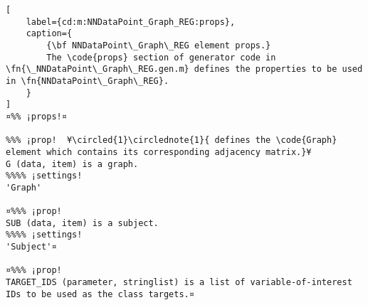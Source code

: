 \documentclass{tufte-handout}
\begin{document}
\begin{lstlisting}[
	label={cd:m:NNDataPoint_Graph_REG:props},
	caption={
		{\bf NNDataPoint\_Graph\_REG element props.}
		The \code{props} section of generator code in \fn{\_NNDataPoint\_Graph\_REG.gen.m} defines the properties to be used in \fn{NNDataPoint\_Graph\_REG}.
	}
]
¤%% ¡props!¤

%%% ¡prop!  ¥\circled{1}\circlednote{1}{ defines the \code{Graph} element which contains its corresponding adjacency matrix.}¥
G (data, item) is a graph.
%%%% ¡settings!
'Graph'

¤%%% ¡prop!
SUB (data, item) is a subject.
%%%% ¡settings!
'Subject'¤

¤%%% ¡prop!
TARGET_IDS (parameter, stringlist) is a list of variable-of-interest IDs to be used as the class targets.¤

\end{lstlisting}

\clearpage
\end{document}
